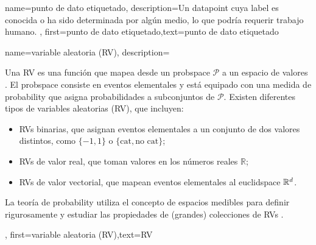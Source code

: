 {name={punto de dato etiquetado},
 description={Un \gls{datapoint} cuya \gls{label} es conocida o ha sido determinada  
 por algún medio, lo que podría requerir trabajo humano.
 },
 first={punto de dato etiquetado},text={punto de dato etiquetado}  
}

{name={variable aleatoria (RV)},
 description={Una RV es una función que mapea desde  
 	un \gls{probspace} $\mathcal{P}$ a un espacio de valores \cite{BillingsleyProbMeasure,GrayProbBook}. 
 	El \gls{probspace} consiste en eventos elementales y está equipado con una medida de \gls{probability} 
 	que asigna probabilidades a subconjuntos de $\mathcal{P}$. 
 	Existen diferentes tipos de variables aleatorias (RV), que incluyen:  
 	\begin{itemize} 
 	\item {RVs binarias}, que asignan eventos elementales a un conjunto de dos valores distintos, como 
 	$\{-1,1\}$ o $\{\text{cat}, \text{no cat}\}$; 
 	\item {RVs de valor real}, que toman valores en los números reales $\mathbb{R}$;  
 	\item {RVs de valor vectorial}, que mapean eventos elementales al \gls{euclidspace} $\mathbb{R}^{d}$.  
 	\end{itemize} 
 	La teoría de \Gls{probability} utiliza el concepto de espacios medibles para definir rigurosamente
 	y estudiar las propiedades de (grandes) colecciones de RVs \cite{BillingsleyProbMeasure}.}, first={variable aleatoria (RV)},text={RV}  }
 
 
